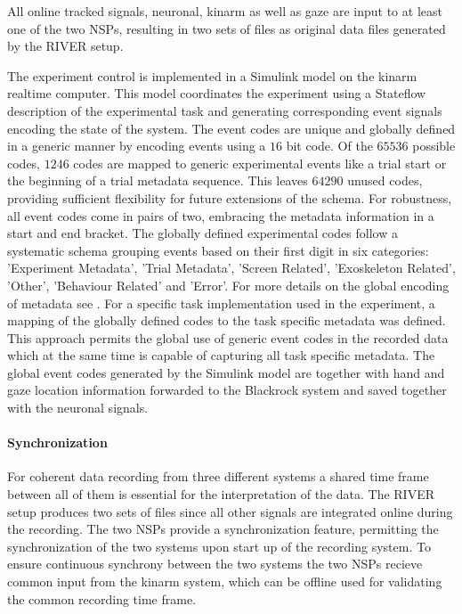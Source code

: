 All online tracked signals, neuronal, kinarm as well as gaze are input to at least one of the  two NSPs, resulting in two sets of  files as original data files generated by the RIVER setup.

The experiment control is implemented in a Simulink model on the kinarm realtime computer. This model coordinates the experiment using a Stateflow description of the experimental task and generating corresponding event signals encoding the state of the system. The event codes are unique and globally defined in a generic manner by encoding events using a $16$ bit code. Of the $65536$ possible codes, $1246$ codes are mapped to generic experimental events like a trial start or the beginning of a trial metadata sequence. This leaves $64290$ unused codes, providing sufficient flexibility for future extensions of the schema. For robustness, all event codes come in pairs of two, embracing the metadata information in a start and end bracket. The globally defined experimental codes follow a systematic schema grouping events based on their first digit in six categories: 'Experiment Metadata', 'Trial Metadata', 'Screen Related', 'Exoskeleton Related', 'Other', 'Behaviour Related' and 'Error'. For more details on the global encoding of metadata see \citet{deHaan_2018a}.
For a specific task implementation used in the experiment, a mapping of the globally defined codes to the task specific metadata was defined. This approach permits the global use of generic event codes in the recorded data which at the same time is capable of capturing all task specific metadata. The global event codes generated by the Simulink model are together with hand and gaze location information forwarded to the Blackrock system and saved together with the neuronal signals.

\paragraph{Synchronization}
For coherent data recording from three different systems a shared time frame between all of them is essential for the interpretation of the data. The RIVER setup produces two sets of  files since all other signals are integrated online during the recording. The two NSPs provide a synchronization feature, permitting the synchronization of the two systems upon start up of the recording system. To ensure continuous synchrony between the two systems the two NSPs recieve common input from the kinarm system, which can be offline used for validating the common recording time frame.

